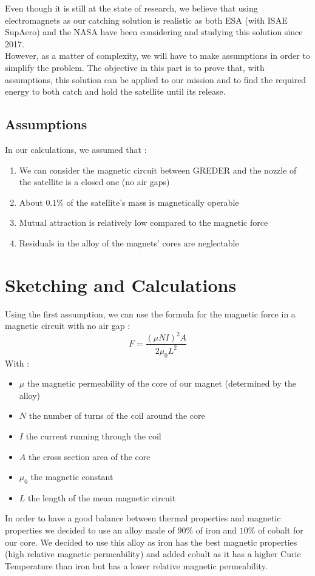 Even though it is still at the state of research, we believe that using electromagnets as our catching solution is realistic as both ESA (with ISAE SupAero) and the NASA have been considering and studying this solution since 2017.\\

However, as a matter of complexity, we will have to make assumptions in order to simplify the problem. The objective in this part is to prove that, with assumptions, this solution can be applied to our mission and to find the required energy to both catch and hold the satellite until its release.
\subsection{Assumptions}
In our calculations, we assumed that :
\begin{enumerate}
	\item We can consider the magnetic circuit between GREDER and the nozzle of the satellite is a closed one (no air gaps)
	\item About $0.1$\% of the satellite's mass is magnetically operable
	\item Mutual attraction is relatively low compared to the magnetic force
	\item Residuals in the alloy of the magnets' cores are neglectable
\end{enumerate}
\section{Sketching and Calculations}
Using the first assumption, we can use the formula for the magnetic force in a magnetic circuit with no air gap :
\begin{equation}
F = \frac{(\mu NI)^2 A}{2\mu_0 L^2}
\end{equation}
With : 
\begin{itemize}
	\item $\mu$ the magnetic permeability of the core of our magnet (determined by the alloy)
	\item $N$ the number of turns of the coil around the core
	\item $I$ the current running through the coil
	\item $A$ the cross section area of the core
	\item $\mu_0$ the magnetic constant
	\item $L$ the length of the mean magnetic circuit
\end{itemize}
In order to have a good balance between thermal properties and magnetic properties we decided to use an alloy made of $90$\% of iron and $10$\% of cobalt for our core. We decided to use this alloy as iron has the best magnetic properties (high relative magnetic permeability) and added cobalt as it has a higher Curie Temperature than iron but has a lower relative magnetic permeability.


